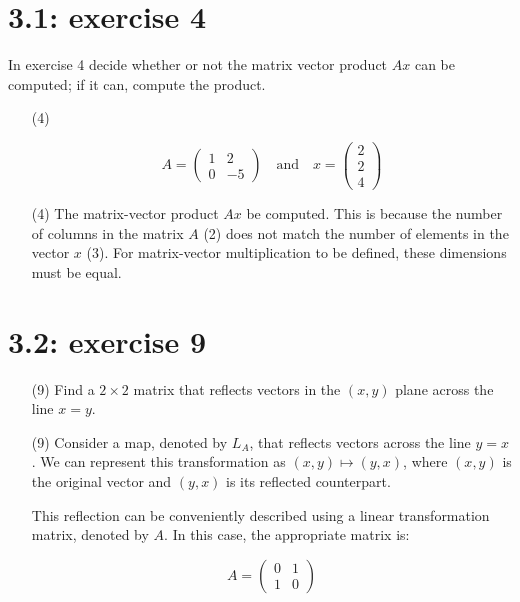 \documentclass{report}
\begin{document}
\section*{3.1: exercise 4} 
    In exercise 4 decide whether or
not the matrix vector product $Ax$ can be computed; if it can, compute the
product.
\begin{enumerate}
    \item[(4)] 

\begin{equation}
A = \begin{pmatrix} 1 & 2 \\ 0 & -5 \end{pmatrix} \quad \text{and} \quad x = \begin{pmatrix} 2 \\ 2 \\4 \end{pmatrix}
\end{equation}
    

\end{enumerate}


\sol

\begin{enumerate}
\item[(4)] The matrix-vector product $Ax$  be computed. 
This is because the number of columns in the matrix $A$ (2) does not match the number of elements in the vector $x$ (3). For matrix-vector multiplication to be defined, these dimensions must be equal.

\end{enumerate}

\section*{3.2: exercise 9} 

\begin{enumerate}
    \item[(9)] Find a $2\times 2$ matrix that reflects vectors in the $(x,y)$ plane across
the line $x=y$.


\end{enumerate}


\sol

\begin{enumerate}
\item[(9)]
Consider a map, denoted by $L_A$, that reflects vectors across the line $y=x$.  We can represent this transformation as $(x, y) \mapsto (y, x)$, where $(x, y)$ is the original vector and $(y, x)$ is its reflected counterpart.

This reflection can be conveniently described using a linear transformation matrix, denoted by $A$. In this case, the appropriate matrix is:

\[
A = \begin{pmatrix} 0 & 1 \\ 1 & 0 \end{pmatrix}
\]
\end{enumerate}
\end{document}
